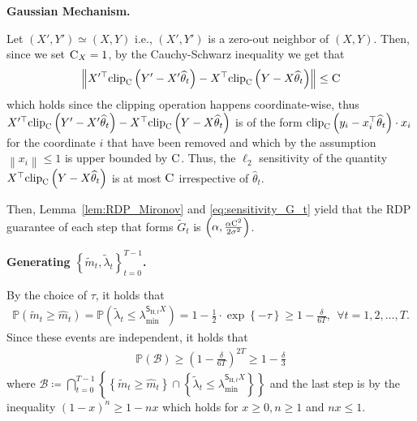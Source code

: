 \documentclass[11pt]{article}
\theoremstyle{definition}
\theoremstyle{plain}
\providecommand{\lemmaref}[1]{Lemma~\ref{#1}}
\newcommand{\Norm}[1]{\left\| #1 \right\|}
\providecommand{\norm}[1]{\Norm{#1}}
\begin{document}
\textbf{Gaussian Mechanism.}

Let \((X', Y') \simeq (X, Y)\) i.e., \((X', Y')\) is a zero-out neighbor of \((X, Y)\). Then, since we set $\textsc{C}_X = 1$, by the Cauchy-Schwarz inequality we get that
\begin{equation}
    \label{eq:sensitivity_G_t}
    \norm{X'^{\top}\mathrm{clip}_{\textsc{C}}\left(Y' - X'\widehat{\theta}_{t}\right) - X^{\top}\mathrm{clip}_{\textsc{C}}\left(Y - X\widehat{\theta}_{t}\right)} \leq \textsc{C}
\end{equation}
which holds since the clipping operation happens coordinate-wise, thus $X'^{\top}\mathrm{clip}_{\textsc{C}}\left(Y' - X'\widehat{\theta}_{t}\right) - X^{\top}\mathrm{clip}_{\textsc{C}}\left(Y - X\widehat{\theta}_{t}\right)$ is of the form $\mathrm{clip}_{\textsc{C}}\left(y_i - x^{\top}_i \widehat{\theta}_t\right)\cdot x_i$ for the coordinate $i$ that have been removed and which by the assumption $\norm{x_i} \leq 1$ is upper bounded by $\textsc{C}$. Thus, the $\ell_2$ sensitivity of the quantity $X^{\top}\mathrm{clip}_{\textsc{C}}\left(Y - X\widehat{\theta}_t\right)$ is at most \(\textsc{C}\) irrespective of \(\widehat{\theta}_{t}\). 

Then, \lemmaref{lem:RDP_Mironov} and \eqref{eq:sensitivity_G_t} yield that the RDP guarantee of each step that forms $\widetilde{G}_t$ is $\left(\alpha,\frac{\alpha\textsc{C}^2}{2\sigma^2}\right)$.


\textbf{Generating $\left\{\widetilde{m}_t, \widetilde{\lambda}_t\right\}^{T-1}_{t=0}$.}\ \ 

By the choice of $\tau$, it holds that 
\begin{align}
    \mathbb{P}\left(\widetilde{m}_t \geq \widehat{m}_t\right) = \mathbb{P}\left(\widetilde{\lambda}_t \leq \lambda^{\mathsf{S}_{\mathrm{H}, t}X}_{\min}\right) = 1 - \frac{1}{2}\cdot \exp\left\{-\tau\right\} \geq 1 - \frac{\delta}{6T}, \ \ \forall t=1,2,\ldots, T.    
\end{align}
Since these events are independent, it holds that 
\begin{align}
    \mathbb{P}\left(\mathcal{B}\right) \geq \left(1 - \frac{\delta}{6T}\right)^{2T} \geq 1 - \frac{\delta}{3}
\end{align}
where $\mathcal{B} \coloneq \bigcap^{T-1}_{t=0} \left\{\left\{\widetilde{m}_t \geq \widehat{m}_t\right\}\cap \left\{\widetilde{\lambda}_t \leq \lambda^{\mathsf{S}_{\mathrm{H}, t}X}_{\min}\right\}\right\}$ and the last step is by the inequality $(1-x)^{n} \geq 1-nx$ which holds for $x\geq 0, n\geq 1$ and $nx \leq 1$.
\end{document}
